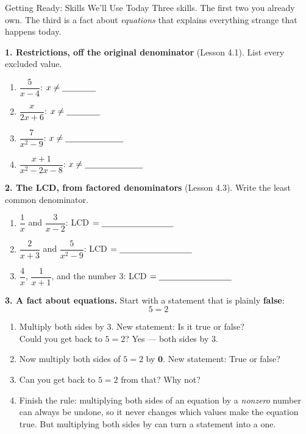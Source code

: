 \documentclass[10pt]{article}
\begin{document}
\namedateperiod

\vspace{0.10in}

\begin{notesbox}{Getting Ready: Skills We'll Use Today}
\small Three skills. The first two you already own. The third is a fact about \emph{equations} that
explains everything strange that happens today.

\vspace{4pt}
\textbf{1. Restrictions, off the original denominator} (Lesson 4.1). List every excluded value.
\begin{enumerate}[label=(\alph*), leftmargin=2.1em, itemsep=3pt]
  \item $\dfrac{5}{x-4}$: \; $x\neq\blank{1.4cm}$
  \item $\dfrac{x}{2x+6}$: \; $x\neq\blank{1.4cm}$
  \item $\dfrac{7}{x^2-9}$: \; $x\neq\blank{2.4cm}$
  \item $\dfrac{x+1}{x^2-2x-8}$: \; $x\neq\blank{2.4cm}$
\end{enumerate}

\vspace{4pt}
\textbf{2. The LCD, from factored denominators} (Lesson 4.3). Write the least common denominator.
\begin{enumerate}[label=(\alph*), leftmargin=2.1em, itemsep=3pt]
  \item $\dfrac{1}{x}$ and $\dfrac{3}{x-2}$: \quad LCD $=\blank{3.0cm}$
  \item $\dfrac{2}{x+3}$ and $\dfrac{5}{x^2-9}$: \quad LCD $=\blank{3.0cm}$
  \item $\dfrac{4}{x}$, \; $\dfrac{1}{x+1}$, \; and the number $3$: \quad LCD $=\blank{3.0cm}$
\end{enumerate}

\vspace{5pt}
\textbf{3. A fact about equations.} Start with a statement that is plainly \textbf{false}:
\[ 5 = 2 \]
\begin{enumerate}[label=(\alph*), leftmargin=2.1em, itemsep=4pt]
  \item Multiply both sides by $3$. New statement: \blank{2.4cm} \; Is it true or false?
        \blank{1.6cm} \\[2pt]
        Could you get back to $5=2$? Yes --- \blank{4.6cm} both sides by $3$.
  \item Now multiply both sides of $5=2$ by $\mathbf{0}$. New statement: \blank{2.4cm} \;
        True or false? \blank{1.6cm}
  \item Can you get back to $5=2$ from that? \blank{1.2cm} \; Why not? \blank{5.6cm}
  \item Finish the rule: multiplying both sides of an equation by a \emph{nonzero} number can always be
        undone, so it never changes which values make the equation true. But multiplying both sides by
        \blank{1.4cm} can turn a \blank{1.6cm} statement into a \blank{1.6cm} one.
\end{enumerate}
\end{notesbox}
\end{document}
